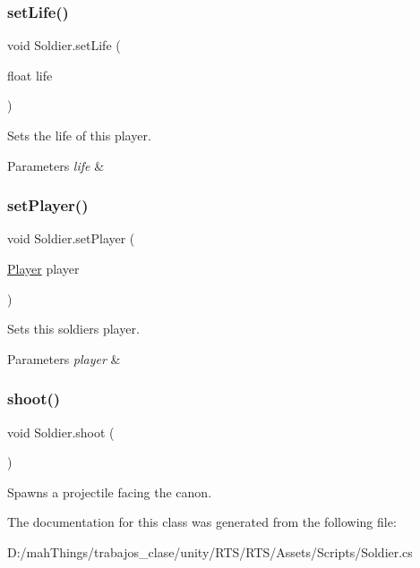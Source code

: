 \subsubsection{\texorpdfstring{set\+Life()}{setLife()}}
{\footnotesize\ttfamily void Soldier.\+set\+Life (\begin{DoxyParamCaption}\item[{float}]{life }\end{DoxyParamCaption})}



Sets the life of this player. 


\begin{DoxyParams}{Parameters}
{\em life} & \\
\hline
\end{DoxyParams}
\mbox{\label{class_soldier_a302b0394d3480d637233770145a28e36}} 
\subsubsection{\texorpdfstring{set\+Player()}{setPlayer()}}
{\footnotesize\ttfamily void Soldier.\+set\+Player (\begin{DoxyParamCaption}\item[{\mbox{\hyperlink{class_player}{Player}}}]{player }\end{DoxyParamCaption})}



Sets this soldiers player. 


\begin{DoxyParams}{Parameters}
{\em player} & \\
\hline
\end{DoxyParams}
\mbox{\label{class_soldier_a8eedc67afe2294da5cefb4712e719692}} 
\subsubsection{\texorpdfstring{shoot()}{shoot()}}
{\footnotesize\ttfamily void Soldier.\+shoot (\begin{DoxyParamCaption}{ }\end{DoxyParamCaption})}



Spawns a projectile facing the canon. 



The documentation for this class was generated from the following file\+:\begin{DoxyCompactItemize}
\item 
D\+:/mah\+Things/trabajos\+\_\+clase/unity/\+R\+T\+S/\+R\+T\+S/\+Assets/\+Scripts/Soldier.\+cs\end{DoxyCompactItemize}
